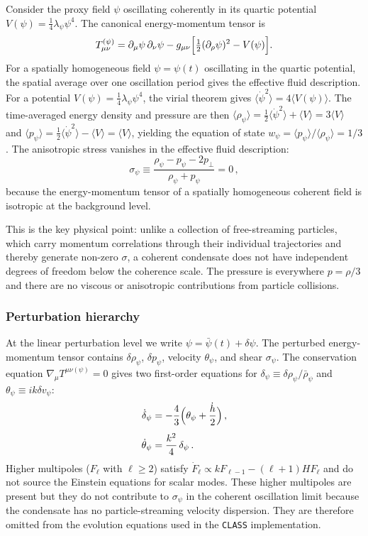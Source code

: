 \documentclass[epj]{svjour}
\begin{document}
Consider the proxy field $\psi$ oscillating coherently in its quartic
potential $V(\psi)=\frac{1}{4}\lambda_\psi\psi^4$. The canonical
energy-momentum tensor is
\begin{equation}
T_{\mu\nu}^{(\psi)}
=\partial_\mu\psi\,\partial_\nu\psi
-g_{\mu\nu}\Bigl[\tfrac12(\partial_\rho\psi)^{2}
-V(\psi)\Bigr].
\end{equation}
For a spatially homogeneous field $\psi=\psi(t)$ oscillating in the
quartic potential, the spatial average over one oscillation period
gives the effective fluid description. For a potential $V(\psi)=\frac{1}{4}\lambda_\psi\psi^4$, the virial theorem gives
$\langle\dot\psi^2\rangle=4\langle V(\psi)\rangle$. The time-averaged
energy density and pressure are then
$\langle\rho_\psi\rangle=\frac{1}{2}\langle\dot\psi^2\rangle+\langle V\rangle
=3\langle V\rangle$ and
$\langle p_\psi\rangle=\frac{1}{2}\langle\dot\psi^2\rangle-\langle V\rangle
=\langle V\rangle$, yielding the equation of state
$w_\psi=\langle p_\psi\rangle/\langle\rho_\psi\rangle=1/3$. The
anisotropic stress vanishes in the effective fluid description:
\begin{equation}
\sigma_\psi \equiv 
\frac{\rho_\psi-p_\psi-2p_\perp}{\rho_\psi+p_\psi}=0\,,
\end{equation}
because the energy-momentum tensor of a spatially homogeneous
coherent field is isotropic at the background level.

This is the key physical point: unlike a collection of free-streaming
particles, which carry momentum correlations through their individual
trajectories and thereby generate non-zero $\sigma$, a coherent
condensate does not have independent degrees of freedom below the
coherence scale. The pressure is everywhere $p=\rho/3$ and there are
no viscous or anisotropic contributions from particle collisions.

\subsubsection{Perturbation hierarchy}

At the linear perturbation level we write $\psi=\bar\psi(t)+\delta\psi$.
The perturbed energy-momentum tensor contains
$\delta\rho_\psi$, $\delta p_\psi$, velocity $\theta_\psi$, and shear
$\sigma_\psi$. The conservation equation
$\nabla_\mu T^{\mu\nu(\psi)}=0$ gives two first-order equations
for $\delta_\psi\equiv\delta\rho_\psi/\bar\rho_\psi$ and
$\theta_\psi\equiv ik\delta v_\psi$:
\begin{align}
\dot\delta_\psi
&=-\frac{4}{3}\Bigl(\theta_\psi+\frac{\dot h}{2}\Bigr)\,,
\label{eq:delta_pfd_main}\\[4pt]
\dot\theta_\psi
&=\frac{k^2}{4}\,\delta_\psi\,.
\label{eq:theta_pfd_main}
\end{align}
Higher multipoles ($F_\ell$ with $\ell\ge2$) satisfy
$\dot F_\ell\propto k F_{\ell-1}-(\ell+1)H F_\ell$ and do not source
the Einstein equations for scalar modes. These higher multipoles are
present but they do not contribute to $\sigma_\psi$ in the coherent
oscillation limit because the condensate has no particle-streaming
velocity dispersion. They are therefore omitted from the evolution
equations used in the \texttt{CLASS} implementation.
\end{document}
